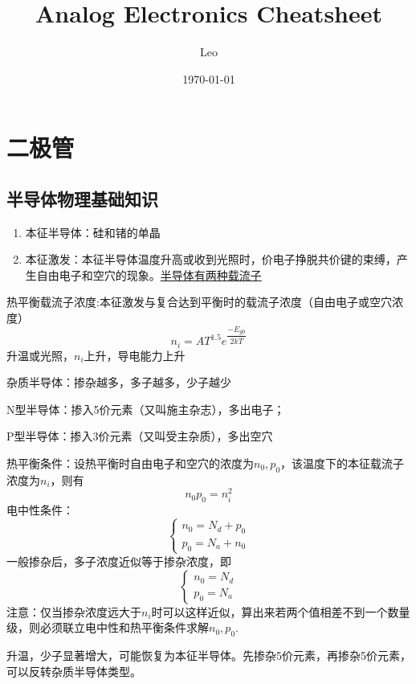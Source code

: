 \documentclass{ctexart}
\title{Analog Electronics Cheatsheet}
\author{Leo}
\date{\today}
\begin{document}
\maketitle
\tableofcontents
\newpage
\section{二极管}
\subsection{半导体物理基础知识}
\begin{enumerate}
    \item 本征半导体：硅和锗的单晶
    \item 本征激发：本征半导体温度升高或收到光照时，价电子挣脱共价键的束缚，产生自由电子和空穴的现象。\underline{半导体有两种载流子}
\end{enumerate}
热平衡载流子浓度:本征激发与复合达到平衡时的载流子浓度（自由电子或空穴浓度）
\begin{equation}
    n_i=AT^{1.5}e^{\dfrac{-E_{g0}}{2kT}}
\end{equation}
升温或光照，$n_i$上升，导电能力上升

杂质半导体：掺杂越多，多子越多，少子越少

N型半导体：掺入5价元素（又叫施主杂志），多出电子；

P型半导体：掺入3价元素（又叫受主杂质），多出空穴

热平衡条件：设热平衡时自由电子和空穴的浓度为$n_0,p_0$，该温度下的本征载流子浓度为$n_i$，则有
\begin{equation}
    n_0p_0=n_i^2
\end{equation}
电中性条件：
\begin{equation}
    \begin{cases}
        n_0=N_d+p_0\\
        p_0=N_a+n_0
    \end{cases}
\end{equation}
一般掺杂后，多子浓度近似等于掺杂浓度，即
\begin{equation}
    \begin{cases}
        n_0=N_d\\
        p_0=N_a
    \end{cases}
\end{equation}
{\color{Red}注意：仅当掺杂浓度远大于$n_i$时可以这样近似，算出来若两个值相差不到一个数量级，则必须联立电中性和热平衡条件求解$n_0,p_0$}.

升温，少子显著增大，可能恢复为本征半导体。先掺杂5价元素，再掺杂5价元素，可以反转杂质半导体类型。
\end{document}
